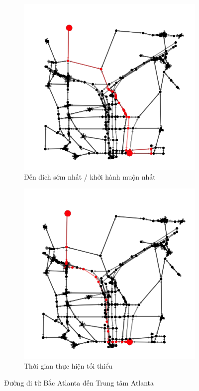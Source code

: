 \documentclass[../main.tex]{subfiles}
\begin{document}

\begin{figure}
    \centering
    \begin{subfigure}{0.45\textwidth}
        \centering
        \includegraphics{edited-images/Figure16a.jpg}
        \caption{Đến đích sớm nhất / khởi hành muộn nhất}
        \label{fig:16a}
    \end{subfigure}
    \begin{subfigure}{0.45\textwidth}
        \centering
        \includegraphics{edited-images/Figure16b.jpg}
        \caption{Thời gian thực hiện tối thiểu}
        \label{fig:16b}
    \end{subfigure}
    \caption{Đường đi từ Bắc Atlanta đến Trung tâm Atlanta}
    \label{fig:16}
\end{figure}
\backmatter
\end{document}
